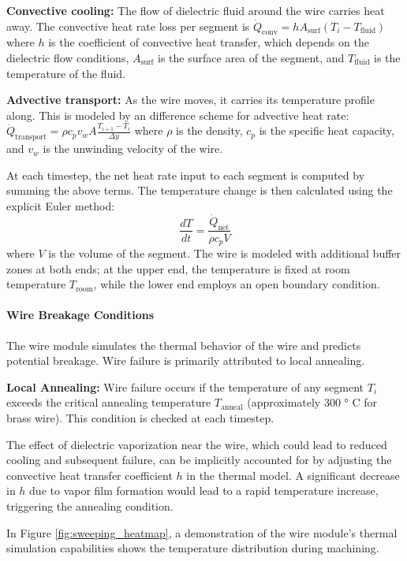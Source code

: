 \documentclass[5p,times,procedia]{elsarticle}
\begin{document}
\textbf{Convective cooling:} The flow of dielectric fluid around the wire carries heat away. The convective heat rate loss per segment is $\dot{Q}_\text{conv} = h A_\text{surf} (T_i - T_\text{fluid})$ where $h$ is the coefficient of convective heat transfer, which depends on the dielectric flow conditions, $A_\text{surf}$ is the surface area of the segment, and $T_\text{fluid}$ is the temperature of the fluid.

\textbf{Advective transport:} As the wire moves, it carries its temperature profile along. This is modeled by an difference scheme for advective heat rate: $\dot{Q}_\text{transport} = \rho c_p v_w A \frac{T_{i+1} - T_i}{\Delta y}$ where $\rho$ is the density, $c_p$ is the specific heat capacity, and $v_w$ is the unwinding velocity of the wire.

At each timestep, the net heat rate input to each segment is computed by summing the above terms. The temperature change is then calculated using the explicit Euler method:
\begin{equation}
\frac{dT}{dt} = \frac{\dot{Q}_\text{net}}{\rho c_p V}
\end{equation}
where $V$ is the volume of the segment.
The wire is modeled with additional buffer zones at both ends; at the upper end, the temperature is fixed at room temperature $T_\text{room}$, while the lower end employs an open boundary condition.

\paragraph{Wire Breakage Conditions}
The wire module simulates the thermal behavior of the wire and predicts potential breakage. Wire failure is primarily attributed to local annealing.

\textbf{Local Annealing:} Wire failure occurs if the temperature of any segment $T_i$ exceeds the critical annealing temperature $T_\text{anneal}$ (approximately 300 ° C for brass wire). This condition is checked at each timestep.

The effect of dielectric vaporization near the wire, which could lead to reduced cooling and subsequent failure, can be implicitly accounted for by adjusting the convective heat transfer coefficient $h$ in the thermal model. A significant decrease in $h$ due to vapor film formation would lead to a rapid temperature increase, triggering the annealing condition.

In Figure \ref{fig:sweeping_heatmap}, a demonstration of the wire module's thermal simulation capabilities shows the temperature distribution during machining.
\end{document}
